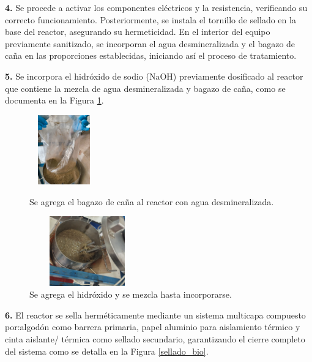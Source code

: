 \documentclass[12pt]{article}
\begin{document}
			\textbf{4.} Se procede a activar los componentes eléctricos y la resistencia, verificando su correcto funcionamiento. Posteriormente, se instala el tornillo de sellado en la base del reactor, asegurando su hermeticidad. En el interior del equipo previamente sanitizado, se incorporan el agua desmineralizada y el bagazo de caña en las proporciones establecidas, iniciando así el proceso de tratamiento. 
			
			\textbf{5.} Se incorpora el hidróxido de sodio (NaOH) previamente dosificado al reactor que contiene la mezcla de agua desmineralizada y bagazo de caña,  como se documenta en la Figura \ref{bagazo con hidroxido}.
			
			
			\begin{figure}[H]
				\centering
				\begin{minipage}{0.46\textwidth}
					\centering
					\includegraphics[width=3cm, height=3cm]{imagenes/agua con bagazo}
					\caption{Se agrega el bagazo de caña al reactor con agua desmineralizada.}
					\label{agua con bagazo}
				\end{minipage}
				\hfill
				\begin{minipage}{0.48\textwidth}
					\centering
					\includegraphics[width=5cm, height=3cm]{imagenes/bagazo con hidroxido1}
					\caption{Se agrega el hidróxido y se mezcla hasta incorporarse.}
					\label{bagazo con hidroxido}
				\end{minipage}
			\end{figure}
			
			
			\textbf{6.} El reactor se sella herméticamente mediante un sistema multicapa compuesto por:algodón como barrera primaria, papel aluminio para aislamiento térmico y cinta aislante/ térmica como sellado secundario, garantizando el cierre completo del sistema como se detalla en la Figura \ref{sellado_bio}.
			
			
			
\end{document}

